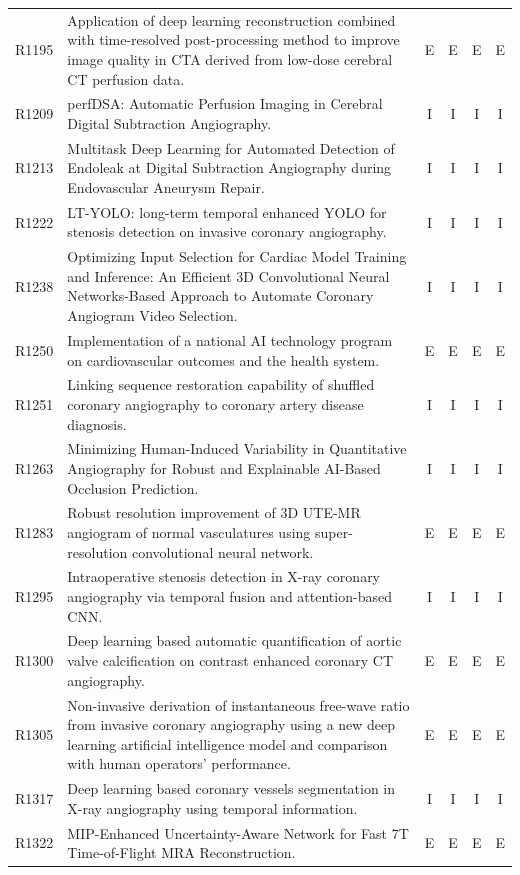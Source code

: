 \begin{longtable}{@{}l p{8.6cm} c c c c@{}}
R1195 & Application of deep learning reconstruction combined with time-resolved post-processing method to improve image quality in CTA derived from low-dose cerebral CT perfusion data. & E & E & E & E \\
R1209 & perfDSA: Automatic Perfusion Imaging in Cerebral Digital Subtraction Angiography. & I & I & I & I \\
R1213 & Multitask Deep Learning for Automated Detection of Endoleak at Digital Subtraction Angiography during Endovascular Aneurysm Repair. & I & I & I & I \\
R1222 & LT-YOLO: long-term temporal enhanced YOLO for stenosis detection on invasive coronary angiography. & I & I & I & I \\
R1238 & Optimizing Input Selection for Cardiac Model Training and Inference: An Efficient 3D Convolutional Neural Networks-Based Approach to Automate Coronary Angiogram Video Selection. & I & I & I & I \\
R1250 & Implementation of a national AI technology program on cardiovascular outcomes and the health system. & E & E & E & E \\
R1251 & Linking sequence restoration capability of shuffled coronary angiography to coronary artery disease diagnosis. & I & I & I & I \\
R1263 & Minimizing Human-Induced Variability in Quantitative Angiography for Robust and Explainable AI-Based Occlusion Prediction. & I & I & I & I \\
R1283 & Robust resolution improvement of 3D UTE-MR angiogram of normal vasculatures using super-resolution convolutional neural network. & E & E & E & E \\
R1295 & Intraoperative stenosis detection in X-ray coronary angiography via temporal fusion and attention-based CNN. & I & I & I & I \\
R1300 & Deep learning based automatic quantification of aortic valve calcification on contrast enhanced coronary CT angiography. & E & E & E & E \\
R1305 & Non-invasive derivation of instantaneous free-wave ratio from invasive coronary angiography using a new deep learning artificial intelligence model and comparison with human operators' performance. & E & E & E & E \\
R1317 & Deep learning based coronary vessels segmentation in X-ray angiography using temporal information. & I & I & I & I \\
R1322 & MIP-Enhanced Uncertainty-Aware Network for Fast 7T Time-of-Flight MRA Reconstruction. & E & E & E & E \\

\end{longtable}

